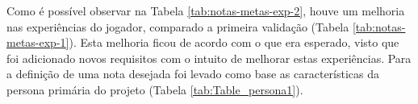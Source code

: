 \begin{apendicesenv}
{Como é possível observar na Tabela \ref{tab:notas-metas-exp-2}, houve um melhoria nas experiências do jogador, comparado a primeira validação (Tabela \ref{tab:notas-metas-exp-1}). Esta melhoria ficou de acordo com o que era esperado, visto que foi adicionado novos requisitos com o intuito de melhorar estas experiências. Para a definição de uma nota desejada foi levado como base as características da persona primária do projeto (Tabela \ref{tab:Table_persona1}).

}

\end{apendicesenv}